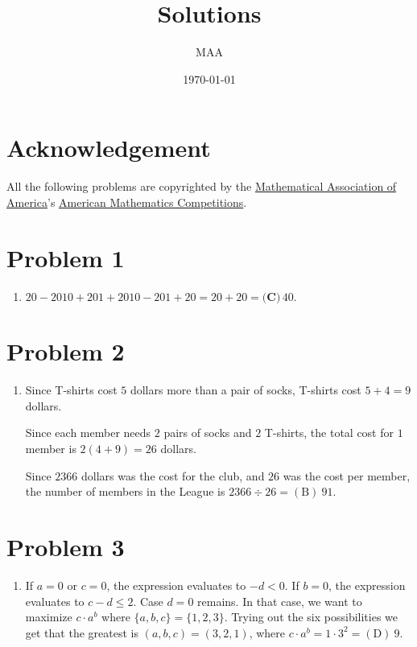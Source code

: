 \documentclass{article}%
\title{Solutions}%
\author{MAA}%
\date{\today}%
\begin{document}
%
\normalsize%
\maketitle%
\section*{Acknowledgement}%
\label{sec:Acknowledgement}%
All the following problems are copyrighted by the \href{https://www.maa.org/}{Mathematical Association of America}'s \href{https://www.maa.org/math-competitions}{American Mathematics Competitions}.

%
\clearpage%
\section*{Problem 1}%
\label{sec:Problem1}%
\begin{enumerate}%
\item%
$20-2010+201+2010-201+20=20+20=\boxed{\textbf{(C)}\,40}$.

%
\end{enumerate}

%
\section*{Problem 2}%
\label{sec:Problem2}%
\begin{enumerate}%
\item%
Since T-shirts cost $5$ dollars more than a pair of socks, T-shirts cost $5+4=9$ dollars. 

Since each member needs $2$ pairs of socks and $2$ T-shirts, the total cost for $1$ member is $2(4+9)=26$ dollars. 

Since $2366$ dollars was the cost for the club, and $26$ was the cost per member, the number of members in the League is $2366\div 26=\boxed{\mathrm{(B)}\ 91}$. 

%
\end{enumerate}

%
\section*{Problem 3}%
\label{sec:Problem3}%
\begin{enumerate}%
\item%
If $a=0$ or $c=0$, the expression evaluates to $-d<0$. 
If $b=0$, the expression evaluates to $c-d\leq 2$. 
Case $d=0$ remains.
In that case, we want to maximize $c\cdot a^b$ where $\{a,b,c\}=\{1,2,3\}$. Trying out the six possibilities we get that the greatest is $(a,b,c)=(3,2,1)$, where $c\cdot a^b=1\cdot 3^2=\boxed{\mathrm{(D)}\ 9}$.

%
\end{enumerate}
\end{document}

